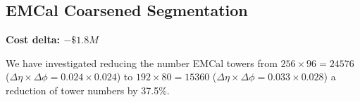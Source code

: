 \subsection{EMCal Coarsened Segmentation}
\label{emcal_segmentation}

\textbf{Cost delta: $-\$1.8M$}

We have investigated reducing the number EMCal towers from
$256\times96=24576$ ($\Delta\eta\times\Delta\phi = 0.024 \times 0.024$) to
$192\times80 = 15360$ ($\Delta\eta\times\Delta\phi = 0.033 \times 0.028$) a
reduction of tower numbers by 37.5\%.
